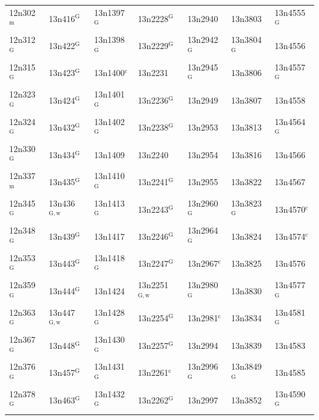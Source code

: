 \documentclass[12pt, oneside]{amsart}
\begin{document}
{\begin{longtable}{*{7}{>{\raggedright\arraybackslash}p{}}}
12n302$^{\mathrm{m}}$ & 13n416$^{\mathrm{G}}$ & 13n1397$^{\mathrm{G}}$ & 13n2228$^{\mathrm{G}}$ & 13n2940 & 13n3803 & 13n4555$^{\mathrm{G}}$ \\
12n312$^{\mathrm{G}}$ & 13n422$^{\mathrm{G}}$ & 13n1398$^{\mathrm{G}}$ & 13n2229$^{\mathrm{G}}$ & 13n2942$^{\mathrm{G}}$ & 13n3804$^{\mathrm{G}}$ & 13n4556 \\
12n315$^{\mathrm{G}}$ & 13n423$^{\mathrm{G}}$ & 13n1400$^{\mathrm{c}}$ & 13n2231 & 13n2945$^{\mathrm{G}}$ & 13n3806 & 13n4557$^{\mathrm{G}}$ \\
12n323$^{\mathrm{G}}$ & 13n424$^{\mathrm{G}}$ & 13n1401$^{\mathrm{G}}$ & 13n2236$^{\mathrm{G}}$ & 13n2949 & 13n3807 & 13n4558 \\
12n324$^{\mathrm{G}}$ & 13n432$^{\mathrm{G}}$ & 13n1402$^{\mathrm{G}}$ & 13n2238$^{\mathrm{G}}$ & 13n2953 & 13n3813 & 13n4564$^{\mathrm{G}}$ \\
12n330$^{\mathrm{G}}$ & 13n434$^{\mathrm{G}}$ & 13n1409 & 13n2240 & 13n2954 & 13n3816 & 13n4566 \\
12n337$^{\mathrm{m}}$ & 13n435$^{\mathrm{G}}$ & 13n1410$^{\mathrm{G}}$ & 13n2241$^{\mathrm{G}}$ & 13n2955 & 13n3822 & 13n4567 \\
12n345$^{\mathrm{G}}$ & 13n436$^{\mathrm{G,w}}$ & 13n1413$^{\mathrm{G}}$ & 13n2243$^{\mathrm{G}}$ & 13n2960$^{\mathrm{G}}$ & 13n3823$^{\mathrm{G}}$ & 13n4570$^{\mathrm{c}}$ \\
12n348$^{\mathrm{G}}$ & 13n439$^{\mathrm{G}}$ & 13n1417 & 13n2246$^{\mathrm{G}}$ & 13n2964$^{\mathrm{G}}$ & 13n3824 & 13n4574$^{\mathrm{c}}$ \\
12n353$^{\mathrm{G}}$ & 13n443$^{\mathrm{G}}$ & 13n1418$^{\mathrm{G}}$ & 13n2247$^{\mathrm{G}}$ & 13n2967$^{\mathrm{c}}$ & 13n3825 & 13n4576 \\
12n359$^{\mathrm{G}}$ & 13n444$^{\mathrm{G}}$ & 13n1424 & 13n2251$^{\mathrm{G,w}}$ & 13n2980$^{\mathrm{G}}$ & 13n3830 & 13n4577$^{\mathrm{G}}$ \\
12n363$^{\mathrm{G}}$ & 13n447$^{\mathrm{G,w}}$ & 13n1428$^{\mathrm{G}}$ & 13n2254$^{\mathrm{G}}$ & 13n2981$^{\mathrm{c}}$ & 13n3834 & 13n4581$^{\mathrm{G}}$ \\
12n367$^{\mathrm{G}}$ & 13n448$^{\mathrm{G}}$ & 13n1430$^{\mathrm{G}}$ & 13n2257$^{\mathrm{G}}$ & 13n2994 & 13n3839 & 13n4583 \\
12n376$^{\mathrm{G}}$ & 13n457$^{\mathrm{G}}$ & 13n1431$^{\mathrm{G}}$ & 13n2261$^{\mathrm{c}}$ & 13n2996$^{\mathrm{G}}$ & 13n3849$^{\mathrm{G}}$ & 13n4585 \\
12n378$^{\mathrm{G}}$ & 13n463$^{\mathrm{G}}$ & 13n1432$^{\mathrm{G}}$ & 13n2262$^{\mathrm{G}}$ & 13n2997 & 13n3852 & 13n4590$^{\mathrm{G}}$ \\

\end{longtable}}
\end{document}
